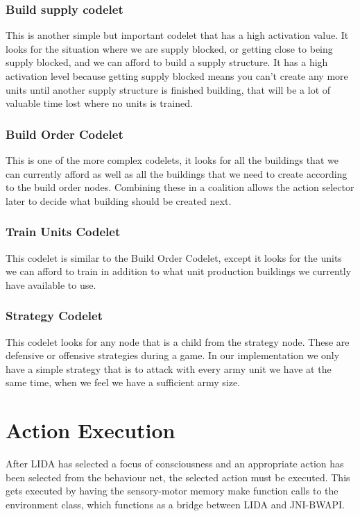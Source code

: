 \subsubsection{Build supply codelet}
This is another simple but important codelet that has a high activation value. It looks for the situation where we are supply blocked, or getting close to being supply blocked, and we can afford to build a supply structure. It has a high activation level because getting supply blocked means you can't create any more units until another supply structure is finished building, that will be a lot of valuable time lost where no units is trained.

\subsubsection{Build Order Codelet}
This is one of the more complex codelets, it looks for all the buildings that we can currently afford as well as all the buildings that we need to create according to the build order nodes. Combining these in a coalition allows the action selector later to decide what building should be created next.

\subsubsection{Train Units Codelet}
This codelet is similar to the Build Order Codelet, except it looks for the units we can afford to train in addition to what unit production buildings we currently have available to use.

\subsubsection{Strategy Codelet}
This codelet looks for any node that is a child from the strategy node. These are defensive or offensive strategies during a game. In our implementation we only have a simple strategy that is to attack with every army unit we have at the same time, when we feel we have a sufficient army size.

\section{Action Execution}
\label{sec:actionexecution}
After LIDA has selected a focus of consciousness and an appropriate action has been selected from the behaviour net, the selected action must be executed. This gets executed by having the sensory-motor memory make function calls to the environment class, which functions as a bridge between LIDA and JNI-BWAPI.

